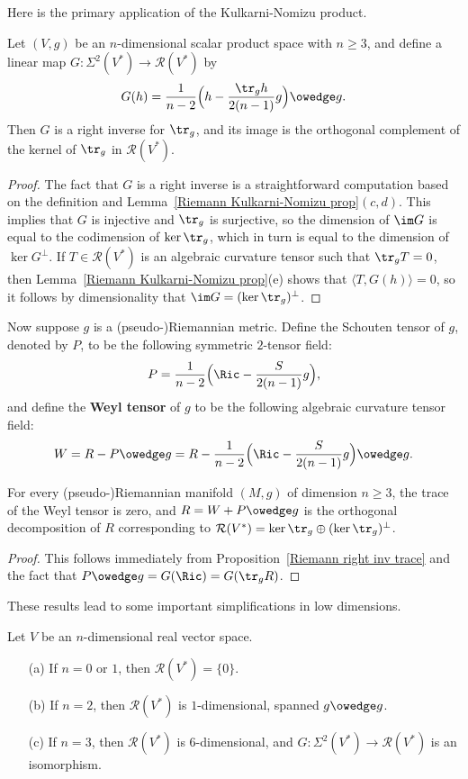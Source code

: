 Here is the primary application of the Kulkarni-Nomizu product.
\begin{proposition}\label{Riemann right inv trace}
Let $(V,g)$ be an $n$-dimensional scalar product space with $n\geq 3$, and define a linear map $G:\Sigma^2(V^*)\to\mathcal{R}(V^*)$ by
\[G(h)=\frac{1}{n-2}\Big(h-\frac{\tr_gh}{2(n-1)}g\Big)\owedge g.\]
Then $G$ is a right inverse for $\tr_g$, and its image is the orthogonal complement of the kernel of $\tr_g$ in $\mathcal{R}(V^*)$.
\end{proposition}
\begin{proof}
The fact that $G$ is a right inverse is a straightforward computation based on the definition and Lemma~\ref{Riemann Kulkarni-Nomizu prop}$(c,d)$. This implies that $G$ 
is injective and $\tr_g$ is surjective, so the dimension of $\im G$ is equal to the codimension of $\ker\tr_g$, which in turn is equal to the dimension of $\ker G^{\bot}$. 
If $T\in\mathcal{R}(V^*)$ is an algebraic curvature tensor such that $\tr_gT=0$, then Lemma~\ref{Riemann Kulkarni-Nomizu prop}(e) shows that $\langle T,G(h)\rangle=0$, 
so it follows by dimensionality that $\im G=(\ker\tr_g)^{\bot}$.
\end{proof}
Now suppose $g$ is a (pseudo-)Riemannian metric. Define the Schouten tensor of $g$, denoted by $P$, to be the following symmetric $2$-tensor field:
\[P=\frac{1}{n-2}\Big(\Ric-\frac{S}{2(n-1)}g\Big),\]
and define the \textbf{Weyl tensor} of $g$ to be the following algebraic curvature tensor field:
\[W=R-P\owedge g=R-\frac{1}{n-2}\Big(\Ric-\frac{S}{2(n-1)}g\Big)\owedge g.\]
\begin{proposition}\label{Riemann weyl tensor traceless}
For every (pseudo-)Riemannian manifold $(M,g)$ of dimension $n\geq 3$, the trace of the Weyl tensor is zero, and $R=W+P\owedge g$ is the orthogonal 
decomposition of $R$ corresponding to $\mathcal{R}(V^*)=\ker\tr_g\oplus(\ker\tr_g)^{\bot}$.
\end{proposition}
\begin{proof}
This follows immediately from Proposition~\ref{Riemann right inv trace} and the fact that $P\owedge g=G(\Ric)=G(\tr_gR)$.
\end{proof}
These results lead to some important simplifications in low dimensions.
\begin{corollary}\label{Riemann algebraic curvature dim=1,2,3}
Let $V$ be an $n$-dimensional real vector space.
\begin{itemize}
\item[(a)] If $n=0$ or $1$, then $\mathcal{R}(V^*)=\{0\}$.
\item[(b)] If $n=2$, then $\mathcal{R}(V^*)$ is $1$-dimensional, spanned $g\owedge g$.
\item[(c)] If $n=3$, then $\mathcal{R}(V^*)$ is $6$-dimensional, and $G:\Sigma^2(V^*)\to\mathcal{R}(V^*)$ is an isomorphism.
\end{itemize}
\end{corollary}
